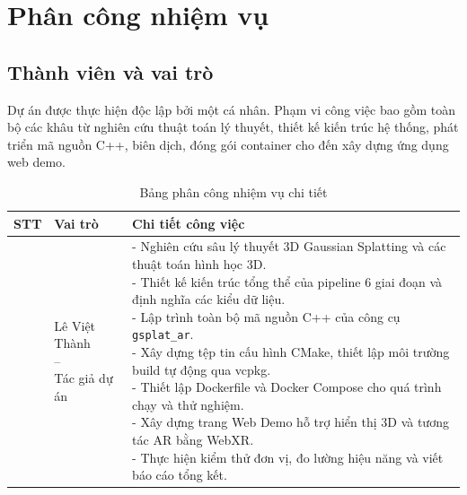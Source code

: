\documentclass[a4paper,12pt]{report}
\begin{document}
\chapter{Phân công nhiệm vụ}

\section{Thành viên và vai trò}
Dự án được thực hiện độc lập bởi một cá nhân. Phạm vi công việc bao gồm toàn bộ các khâu từ nghiên cứu thuật toán lý thuyết, thiết kế kiến trúc hệ thống, phát triển mã nguồn C++, biên dịch, đóng gói container cho đến xây dựng ứng dụng web demo.

\begin{table}[H]
\centering
\small
\setlength{\tabcolsep}{6pt}
\renewcommand{\arraystretch}{1.3}
\begin{tabularx}{\textwidth}{|>{\centering\arraybackslash}p{0.08\textwidth}|>{\centering\arraybackslash}p{0.25\textwidth}|>{\raggedright\arraybackslash}X|}
\hline
\textbf{STT} & \textbf{Vai trò} & \textbf{Chi tiết công việc} \\  & \parbox[t]{0.25\textwidth}{\centering Lê Việt Thành\\--\\Tác giả dự án} &
\parbox[t]{\linewidth}{
- Nghiên cứu sâu lý thuyết 3D Gaussian Splatting và các thuật toán hình học 3D.\\
- Thiết kế kiến trúc tổng thể của pipeline 6 giai đoạn và định nghĩa các kiểu dữ liệu.\\
- Lập trình toàn bộ mã nguồn C++ của công cụ \texttt{gsplat\_ar}.\\
- Xây dựng tệp tin cấu hình CMake, thiết lập môi trường build tự động qua vcpkg.\\
- Thiết lập Dockerfile và Docker Compose cho quá trình chạy và thử nghiệm.\\
- Xây dựng trang Web Demo hỗ trợ hiển thị 3D và tương tác AR bằng WebXR.\\
- Thực hiện kiểm thử đơn vị, đo lường hiệu năng và viết báo cáo tổng kết.
} \\ \hline
\end{tabularx}
\normalsize
\caption{Bảng phân công nhiệm vụ chi tiết}
\label{tab:bang_phan_cong}
\end{table}

\clearpage
\end{document}
